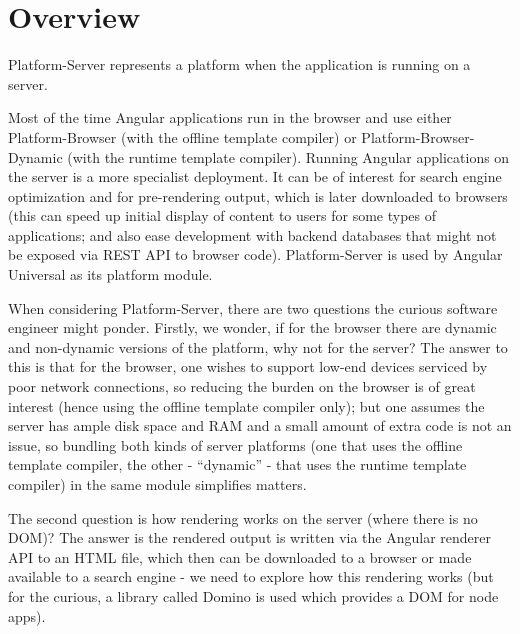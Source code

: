\section{Overview}

Platform-Server represents a platform when the application is running on a server.

Most of the time Angular applications run in the browser and use either
Platform-Browser (with the offline template compiler) or Platform-Browser-Dynamic
(with the runtime template compiler). Running Angular applications on the server is a
more specialist deployment. It can be of interest for search engine optimization and
for pre-rendering output, which is later downloaded to browsers (this can speed up
initial display of content to users for some types of applications; and also ease
development with backend databases that might not be exposed via REST API to
browser code). Platform-Server is used by Angular Universal as its platform module.

When considering Platform-Server, there are two questions the curious software
engineer might ponder. Firstly, we wonder, if for the browser there are dynamic and
non-dynamic versions of the platform, why not for the server? The answer to this is
that for the browser, one wishes to support low-end devices serviced by poor network
connections, so reducing the burden on the browser is of great interest (hence using
the offline template compiler only); but one assumes the server has ample disk space
and RAM and a small amount of extra code is not an issue, so bundling both kinds of
server platforms (one that uses the offline template compiler, the other - “dynamic” -
that uses the runtime template compiler) in the same module simplifies matters.

The second question is how rendering works on the server (where there is no DOM)?
The answer is the rendered output is written via the Angular renderer API to an HTML
file, which then can be downloaded to a browser or made available to a search engine
- we need to explore how this rendering works (but for the curious, a library called
Domino is used which provides a DOM for node apps).
